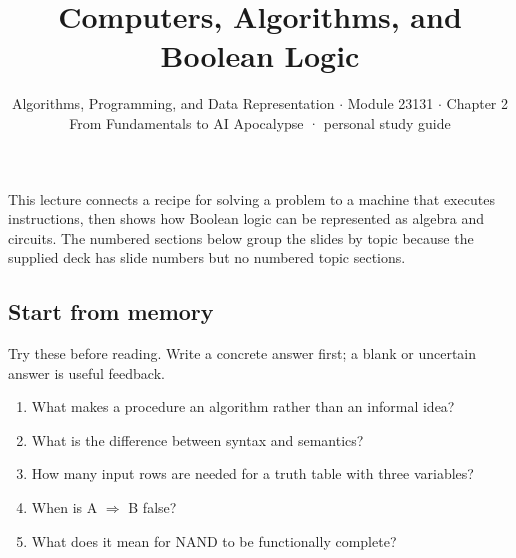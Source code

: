 \documentclass[11pt]{article}
\title{\sffamily\bfseries\color{FAUblue}Computers, Algorithms, and Boolean Logic}
\author{Algorithms, Programming, and Data Representation \ensuremath{\cdot} Module 23131 \ensuremath{\cdot} Chapter 2\\[2pt]\small From Fundamentals to AI Apocalypse · personal study guide}
\date{}
\begin{document}
\maketitle
\begingroup\footnotesize\setlength{\parskip}{0pt}\tableofcontents\endgroup
\clearpage

{\large This lecture connects a recipe for solving a problem to a machine that executes instructions, then shows how Boolean logic can be represented as algebra and circuits. The numbered sections below group the slides by topic because the supplied deck has slide numbers but no numbered topic sections.}


\begin{keepsection}
\section{Start from memory}

Try these before reading. Write a concrete answer first; a blank or uncertain answer is useful feedback.

\begin{enumerate}
\item What makes a procedure an algorithm rather than an informal idea?
\item What is the difference between syntax and semantics?
\item How many input rows are needed for a truth table with three variables?
\item When is A \ensuremath{\Rightarrow} B false?
\item What does it mean for NAND to be functionally complete?
\end{enumerate}

\end{keepsection}
\end{document}
